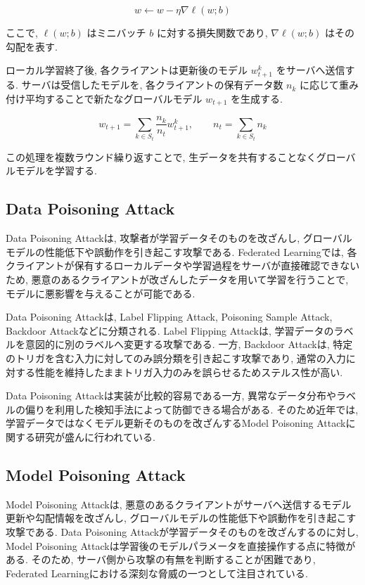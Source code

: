 \documentclass[a4j, twocolumn, dvipdfmx]{jsarticle}
\begin{document}
\begin{equation}
w \leftarrow w-\eta\nabla \ell(w;b)
\end{equation}

ここで, $\ell(w;b)$ はミニバッチ $b$ に対する損失関数であり, $\nabla \ell(w;b)$ はその勾配を表す.

ローカル学習終了後, 各クライアントは更新後のモデル $w_{t+1}^{k}$ をサーバへ送信する.
サーバは受信したモデルを, 各クライアントの保有データ数 $n_k$ に応じて重み付け平均することで新たなグローバルモデル $w_{t+1}$ を生成する.

\begin{equation}
w_{t+1}
=
\sum_{k \in S_t}
\frac{n_k}{n_t}
w_{t+1}^{k},
\qquad
n_t=\sum_{k\in S_t}n_k
\end{equation}

この処理を複数ラウンド繰り返すことで, 生データを共有することなくグローバルモデルを学習する.

\subsection{Data Poisoning Attack}

Data Poisoning Attackは, 攻撃者が学習データそのものを改ざんし, グローバルモデルの性能低下や誤動作を引き起こす攻撃である. Federated Learningでは, 各クライアントが保有するローカルデータや学習過程をサーバが直接確認できないため, 悪意のあるクライアントが改ざんしたデータを用いて学習を行うことで, モデルに悪影響を与えることが可能である\cite{sagar2023survey}.

Data Poisoning Attackは, Label Flipping Attack, Poisoning Sample Attack, Backdoor Attackなどに分類される. Label Flipping Attackは, 学習データのラベルを意図的に別のラベルへ変更する攻撃である. 一方, Backdoor Attackは, 特定のトリガを含む入力に対してのみ誤分類を引き起こす攻撃であり, 通常の入力に対する性能を維持したままトリガ入力のみを誤らせるためステルス性が高い.

Data Poisoning Attackは実装が比較的容易である一方, 異常なデータ分布やラベルの偏りを利用した検知手法によって防御できる場合がある. そのため近年では, 学習データではなくモデル更新そのものを改ざんするModel Poisoning Attackに関する研究が盛んに行われている\cite{sagar2023survey,xie2020dba,nguyen2022flame}.

\subsection{Model Poisoning Attack}

Model Poisoning Attackは, 悪意のあるクライアントがサーバへ送信するモデル更新や勾配情報を改ざんし, グローバルモデルの性能低下や誤動作を引き起こす攻撃である. Data Poisoning Attackが学習データそのものを改ざんするのに対し, Model Poisoning Attackは学習後のモデルパラメータを直接操作する点に特徴がある. そのため, サーバ側から攻撃の有無を判断することが困難であり, Federated Learningにおける深刻な脅威の一つとして注目されている\cite{sagar2023survey}.
\end{document}
